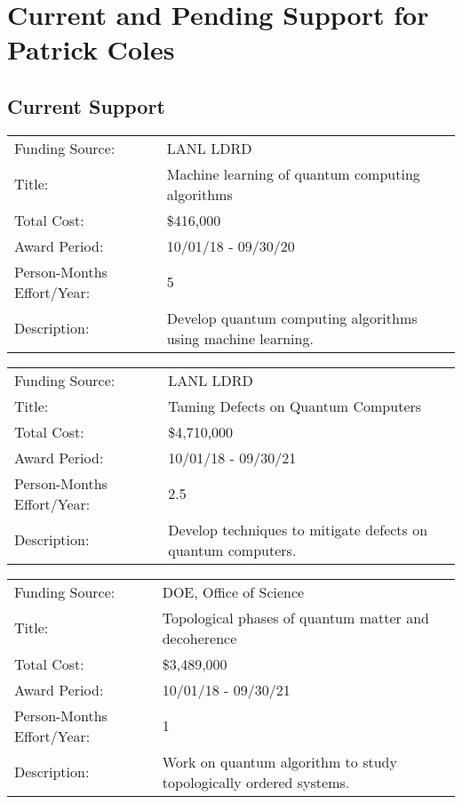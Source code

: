\documentclass[10pt]{article}
\begin{document}
\section*{Current and Pending Support for Patrick Coles}


\subsection*{Current Support}
\begin{description}

\item
\begin{tabularx}{\linewidth}{lX}
Funding Source:         & LANL LDRD\\
Title:                  & Machine learning of quantum computing algorithms \\
Total Cost:             & \$416,000 \\
Award Period:           & 10/01/18 - 09/30/20 \\
Person-Months Effort/Year: & 5\\
Description:            & Develop quantum computing algorithms using machine learning. \\ 
\end{tabularx}

\item
\begin{tabularx}{\linewidth}{lX}
Funding Source:         & LANL LDRD\\
Title:                  & Taming Defects on Quantum Computers \\
Total Cost:             & \$4,710,000 \\
Award Period:           & 10/01/18 - 09/30/21 \\
Person-Months Effort/Year: & 2.5\\
Description:            & Develop techniques to mitigate defects on quantum computers. \\
\end{tabularx}

\item
\begin{tabularx}{\linewidth}{lX}
Funding Source:         & DOE, Office of Science\\
Title:                  & Topological phases of quantum matter and decoherence \\
Total Cost:             & \$3,489,000 \\
Award Period:           & 10/01/18 - 09/30/21 \\
Person-Months Effort/Year: & 1\\
Description:            & Work on quantum algorithm to study topologically ordered systems. \\
\end{tabularx}


\end{description}
\end{document}
